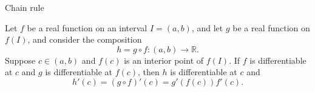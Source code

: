 \documentclass{beamer}
\begin{document}
\begin{frame}{Chain rule}
\begin{thm}
Let $f$ be a real function on an interval $I = (a,b)$, and let $g$ be a real function on $f(I)$, and consider the composition
$$h = g\circ f: (a,b)\rightarrow\mathbb{R}.$$
Suppose $c\in (a,b)$ and $f(c)$ is an interior point of $f(I)$.
If $f$ is differentiable at $c$ and $g$ is differentiable at $f(c)$, then $h$ is differentiable at $c$ and
$$h'(c) = (g\circ f)'(c) = g'(f(c))f'(c).$$
\end{thm}
\end{frame}
\end{document}
